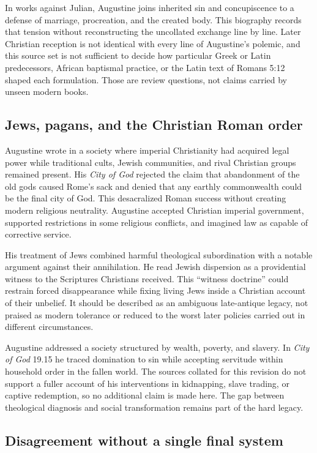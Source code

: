 In works against Julian, Augustine joins inherited sin and concupiscence to a
defense of marriage, procreation, and the created body. This biography records
that tension without reconstructing the uncollated exchange line by line.
Later Christian reception is not identical with every line of Augustine's
polemic, and this source set is not sufficient to decide how particular Greek
or Latin predecessors, African baptismal practice, or the Latin text of Romans
5:12 shaped each formulation. Those are review questions, not claims carried
by unseen modern books.

\subsection{Jews, pagans, and the Christian Roman order}

Augustine wrote in a society where imperial Christianity had acquired legal
power while traditional cults, Jewish communities, and rival Christian groups
remained present. His \emph{City of God} rejected the claim that abandonment
of the old gods caused Rome's sack and denied that any earthly commonwealth
could be the final city of God. This desacralized Roman success without
creating modern religious neutrality. Augustine accepted Christian imperial
government, supported restrictions in some religious conflicts, and imagined
law as capable of corrective service.

His treatment of Jews combined harmful theological subordination with a
notable argument against their annihilation. He read Jewish dispersion as a
providential witness to the Scriptures Christians received. This “witness
doctrine” could restrain forced disappearance while fixing living Jews inside
a Christian account of their unbelief. It should be described as an ambiguous
late-antique legacy, not praised as modern tolerance or reduced to the worst
later policies carried out in different circumstances.

Augustine addressed a society structured by wealth, poverty, and slavery. In
\emph{City of God} 19.15 he traced domination to sin while accepting servitude
within household order in the fallen world. The sources collated for this
revision do not support a fuller account of his interventions in kidnapping,
slave trading, or captive redemption, so no additional claim is made here. The
gap between theological diagnosis and social transformation remains part of
the hard legacy.

\subsection{Disagreement without a single final system}

